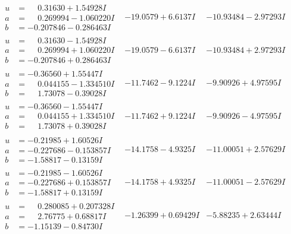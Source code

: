 \documentclass[1p]{elsarticle_modified}
\theoremstyle{definition}
\begin{document}
$$\begin{array}{c|c|c}
\begin{aligned}
u &= \phantom{-}0.31630 + 1.54928 I \\
a &= \phantom{-}0.269994 - 1.060220 I \\
b &= -0.207846 - 0.286463 I\end{aligned}
 & -19.0579 + 6.6137 I & -10.93484 - 2.97293 I \\ \hline\begin{aligned}
u &= \phantom{-}0.31630 - 1.54928 I \\
a &= \phantom{-}0.269994 + 1.060220 I \\
b &= -0.207846 + 0.286463 I\end{aligned}
 & -19.0579 - 6.6137 I & -10.93484 + 2.97293 I \\ \hline\begin{aligned}
u &= -0.36560 + 1.55447 I \\
a &= \phantom{-}0.044155 - 1.334510 I \\
b &= \phantom{-}1.73078 - 0.39028 I\end{aligned}
 & -11.7462 - 9.1224 I & -9.90926 + 4.97595 I \\ \hline\begin{aligned}
u &= -0.36560 - 1.55447 I \\
a &= \phantom{-}0.044155 + 1.334510 I \\
b &= \phantom{-}1.73078 + 0.39028 I\end{aligned}
 & -11.7462 + 9.1224 I & -9.90926 - 4.97595 I \\ \hline\begin{aligned}
u &= -0.21985 + 1.60526 I \\
a &= -0.227686 - 0.153857 I \\
b &= -1.58817 - 0.13159 I\end{aligned}
 & -14.1758 - 4.9325 I & -11.00051 + 2.57629 I \\ \hline\begin{aligned}
u &= -0.21985 - 1.60526 I \\
a &= -0.227686 + 0.153857 I \\
b &= -1.58817 + 0.13159 I\end{aligned}
 & -14.1758 + 4.9325 I & -11.00051 - 2.57629 I \\ \hline\begin{aligned}
u &= \phantom{-}0.280085 + 0.207328 I \\
a &= \phantom{-}2.76775 + 0.68817 I \\
b &= -1.15139 - 0.84730 I\end{aligned}
 & -1.26399 + 0.69429 I & -5.88235 + 2.63444 I \\ \hline\begin{aligned}

\end{aligned}
\end{array}$$
\end{document}
